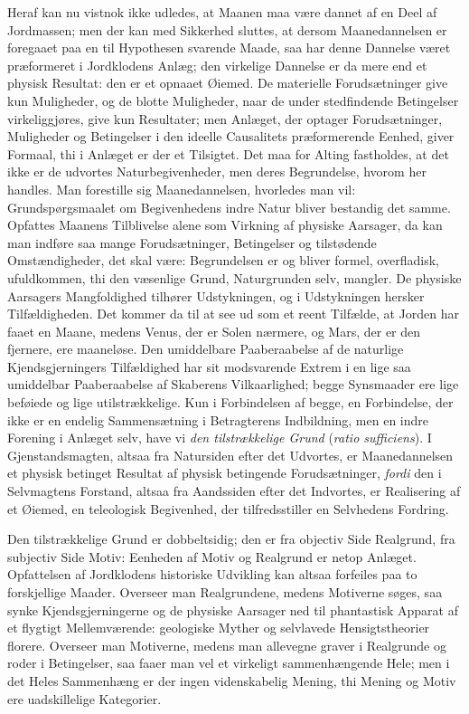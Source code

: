 \documentclass[12pt,a4paper]{book}
\begin{document}
Heraf kan nu vistnok ikke udledes, at Maanen maa
være dannet af en Deel af Jordmassen; men der kan med Sikkerhed sluttes, at
dersom Maanedannelsen er foregaaet paa en til Hypothesen svarende Maade, saa
har denne Dannelse været præformeret i Jordklodens Anlæg; den virkelige
Dannelse er da mere end et physisk Resultat: den er et opnaaet Øiemed. De
materielle Forudsætninger give kun Muligheder, og de blotte Muligheder, naar
de under stedfindende Betingelser virkeliggjøres, give kun Resultater; men
Anlæget, der optager Forudsætninger, Muligheder og Betingelser i den ideelle
Causalitets præformerende Eenhed, giver Formaal, thi i Anlæget er der et
Tilsigtet. Det maa for Alting fastholdes, at det ikke er de udvortes
Naturbegivenheder, men deres Begrundelse, hvorom her handles. Man forestille
sig Maanedannelsen, hvorledes man vil: Grundspørgsmaalet om Begivenhedens
indre Natur bliver bestandig det samme. Opfattes Maanens Tilblivelse alene som
Virkning af physiske Aarsager, da kan man indføre saa mange Forudsætninger,
Betingelser og tilstødende Omstændigheder, det skal være: Begrundelsen er og
bliver formel, overfladisk, ufuldkommen, thi den væsenlige Grund,
Naturgrunden selv, mangler. De physiske Aarsagers Mangfoldighed tilhører
Udstykningen, og i Udstykningen hersker Tilfældigheden. Det kommer da til at
see ud som et reent Tilfælde, at Jorden har faaet en Maane, medens Venus, der
er Solen nærmere, og Mars, der er den fjernere, ere maaneløse. Den
umiddelbare Paaberaabelse af de naturlige Kjendsgjerningers Tilfældighed har
sit modsvarende Extrem i en lige saa umiddelbar Paaberaabelse af Skaberens
Vilkaarlighed; begge Synsmaader ere lige beføiede og lige utilstrækkelige.
Kun i Forbindelsen af begge, en Forbindelse, der ikke er en endelig
Sammensætning i Betragterens Indbildning, men en indre Forening i Anlæget
selv, have vi \emph{den tilstrækkelige Grund} (\textit{ratio sufficiens}). I
Gjenstandsmagten, altsaa fra Natursiden efter det Udvortes, er
Maanedannelsen et physisk
betinget Resultat af physisk betingende Forudsætninger, \emph{fordi} den i
Selvmagtens Forstand, altsaa fra Aandssiden efter det Indvortes, er
Realisering af et Øiemed, en teleologisk Begivenhed, der tilfredsstiller en
Selvhedens Fordring.

Den tilstrækkelige Grund er dobbeltsidig; den er fra objectiv Side Realgrund,
fra subjectiv Side Motiv: Eenheden af Motiv og Realgrund er netop Anlæget.
Opfattelsen af Jordklodens historiske Udvikling kan altsaa forfeiles paa to
forskjellige Maader. Overseer man Realgrundene, medens Motiverne søges, saa
synke Kjendsgjerningerne og de physiske Aarsager ned til phantastisk Apparat
af et flygtigt Mellemværende: geologiske Myther og selvlavede
Hensigtstheorier florere. Overseer man Motiverne, medens man allevegne graver
i Realgrunde og roder i Betingelser, saa faaer man vel et virkeligt
sammenhængende Hele; men i det Heles Sammenhæng er der ingen videnskabelig
Mening, thi Mening og Motiv ere uadskillelige Kategorier.
\end{document}
